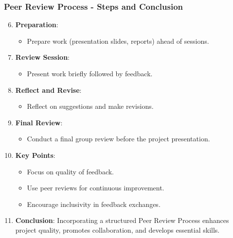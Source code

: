 \documentclass[aspectratio=169]{beamer}
\begin{document}
\begin{frame}[fragile]
    \frametitle{Peer Review Process - Steps and Conclusion}
    \begin{enumerate}
        \setcounter{enumi}{5}
        \item \textbf{Preparation}:
            \begin{itemize}
                \item Prepare work (presentation slides, reports) ahead of sessions.
            \end{itemize}

        \item \textbf{Review Session}:
            \begin{itemize}
                \item Present work briefly followed by feedback.
            \end{itemize}

        \item \textbf{Reflect and Revise}:
            \begin{itemize}
                \item Reflect on suggestions and make revisions.
            \end{itemize}

        \item \textbf{Final Review}:
            \begin{itemize}
                \item Conduct a final group review before the project presentation.
            \end{itemize}
        
        \item \textbf{Key Points}:
            \begin{itemize}
                \item Focus on quality of feedback.
                \item Use peer reviews for continuous improvement.
                \item Encourage inclusivity in feedback exchanges.
            \end{itemize}
        
        \item \textbf{Conclusion}: 
            Incorporating a structured Peer Review Process enhances project quality, promotes collaboration, and develops essential skills.
    \end{enumerate}
\end{frame}
\end{document}
